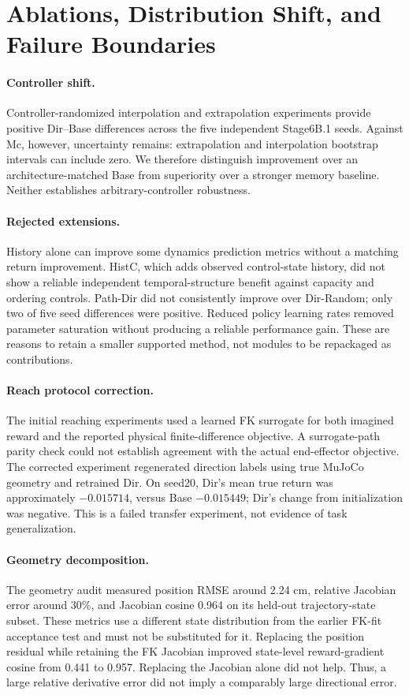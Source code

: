 \section{Ablations, Distribution Shift, and Failure Boundaries}
\paragraph{Controller shift.}
Controller-randomized interpolation and extrapolation experiments provide positive Dir--Base differences across the five independent Stage6B.1 seeds. Against Mc, however, uncertainty remains: extrapolation and interpolation bootstrap intervals can include zero. We therefore distinguish improvement over an architecture-matched Base from superiority over a stronger memory baseline. Neither establishes arbitrary-controller robustness.

\paragraph{Rejected extensions.}
History alone can improve some dynamics prediction metrics without a matching return improvement. HistC, which adds observed control-state history, did not show a reliable independent temporal-structure benefit against capacity and ordering controls. Path-Dir did not consistently improve over Dir-Random; only two of five seed differences were positive. Reduced policy learning rates removed parameter saturation without producing a reliable performance gain. These are reasons to retain a smaller supported method, not modules to be repackaged as contributions.

\paragraph{Reach protocol correction.}
The initial reaching experiments used a learned FK surrogate for both imagined reward and the reported physical finite-difference objective. A surrogate-path parity check could not establish agreement with the actual end-effector objective. The corrected experiment regenerated direction labels using true MuJoCo geometry and retrained Dir. On seed20, Dir's mean true return was approximately $-0.015714$, versus Base $-0.015449$; Dir's change from initialization was negative. This is a failed transfer experiment, not evidence of task generalization.

\paragraph{Geometry decomposition.}
The geometry audit measured position RMSE around 2.24 cm, relative Jacobian error around 30\%, and Jacobian cosine 0.964 on its held-out trajectory-state subset. These metrics use a different state distribution from the earlier FK-fit acceptance test and must not be substituted for it. Replacing the position residual while retaining the FK Jacobian improved state-level reward-gradient cosine from 0.441 to 0.957. Replacing the Jacobian alone did not help. Thus, a large relative derivative error did not imply a comparably large directional error.

